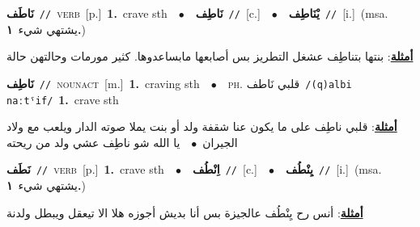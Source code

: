 \documentclass[10pt,a4paper,twoside]{article} %
\begin{document}
\begin{multicols}{2}
{\setlength\topsep{0pt}\textbf{\foreignlanguage{arabic}{نَاطَف}}\ {\color{gray}\texttt{//}\color{black}}\ \textsc{verb}\ [p.]\ \textbf{1.}~crave sth\ \ $\bullet$\ \ \setlength\topsep{0pt}\textbf{\foreignlanguage{arabic}{نَاطِف}}\ {\color{gray}\texttt{//}\color{black}}\ [c.]\ \ $\bullet$\ \ \setlength\topsep{0pt}\textbf{\foreignlanguage{arabic}{يْنَاطِف}}\ {\color{gray}\texttt{//}\color{black}}\ [i.]\ \color{gray}(msa. \foreignlanguage{arabic}{يشتهي شيء}~\foreignlanguage{arabic}{\textbf{١.}})\color{black}\  \begin{flushright}\color{gray}\foreignlanguage{arabic}{\textbf{\underline{\foreignlanguage{arabic}{أمثلة}}}: بنتها بتناطِف عشغل التطريز بس أصابعها مابساعدوها. كثير مورمات وحالتهن حالة}\end{flushright}\color{black}} \vspace{2mm}

{\setlength\topsep{0pt}\textbf{\foreignlanguage{arabic}{نَاطِف}}\ {\color{gray}\texttt{//}\color{black}}\ \textsc{noun\textunderscore act}\ [m.]\ \textbf{1.}~craving sth\ \ $\bullet$\ \ \textsc{ph.} \color{gray} \foreignlanguage{arabic}{قلبي نَاطف}\color{black}\ {\color{gray}\texttt{/{\sffamily (q)albi naːtˤif}/}\color{black}}\ \textbf{1.}~crave sth\  \begin{flushright}\color{gray}\foreignlanguage{arabic}{\textbf{\underline{\foreignlanguage{arabic}{أمثلة}}}: قلبي ناطِف على ما يكون عنا شقفة ولد أو بنت يملا صوته الدار ويلعب مع ولاد الجيران\ $\bullet$\ \  يا الله شو ناطِف عشي ولد من ريحته}\end{flushright}\color{black}} \vspace{2mm}

{\setlength\topsep{0pt}\textbf{\foreignlanguage{arabic}{نَطَف}}\ {\color{gray}\texttt{//}\color{black}}\ \textsc{verb}\ [p.]\ \textbf{1.}~crave sth\ \ $\bullet$\ \ \setlength\topsep{0pt}\textbf{\foreignlanguage{arabic}{اِنْطُف}}\ {\color{gray}\texttt{//}\color{black}}\ [c.]\ \ $\bullet$\ \ \setlength\topsep{0pt}\textbf{\foreignlanguage{arabic}{يِنْطُف}}\ {\color{gray}\texttt{//}\color{black}}\ [i.]\ \color{gray}(msa. \foreignlanguage{arabic}{يشتهي شيء}~\foreignlanguage{arabic}{\textbf{١.}})\color{black}\  \begin{flushright}\color{gray}\foreignlanguage{arabic}{\textbf{\underline{\foreignlanguage{arabic}{أمثلة}}}: أنس رح يِنْطُف عالجيزة بس أنا بديش أجوزه هلا الا تيعقل ويبطل ولدنة}\end{flushright}\color{black}} \vspace{2mm}


\end{multicols}
\end{document}
